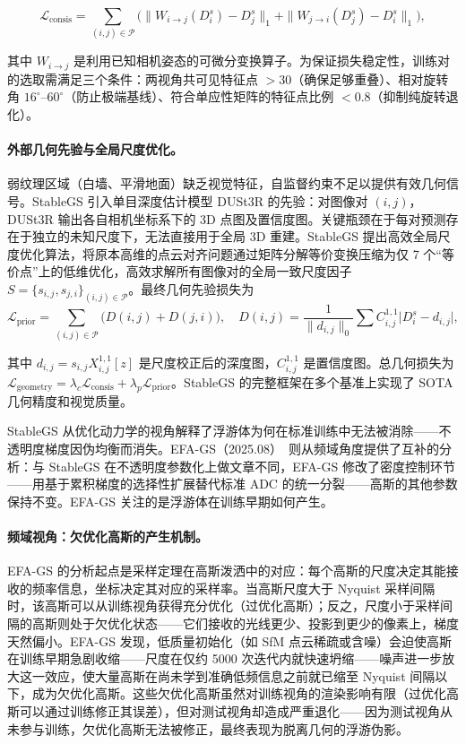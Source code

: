 \begin{equation}
\mathcal{L}_{\mathrm{consis}} = \sum_{(i,j) \in \mathcal{P}} \bigl(\|W_{i \to j}(D_i^s) - D_j^s\|_1 + \|W_{j \to i}(D_j^s) - D_i^s\|_1\bigr),
\label{eq:02_depth_consis}
\end{equation}

其中 $W_{i \to j}$ 是利用已知相机姿态的可微分变换算子。为保证损失稳定性，训练对的选取需满足三个条件：两视角共可见特征点 $>30$（确保足够重叠）、相对旋转角 $16^\circ\text{--}60^\circ$（防止极端基线）、符合单应性矩阵的特征点比例 $< 0.8$（抑制纯旋转退化）。

\paragraph{外部几何先验与全局尺度优化。}弱纹理区域（白墙、平滑地面）缺乏视觉特征，自监督约束不足以提供有效几何信号。StableGS 引入单目深度估计模型 DUSt3R 的先验：对图像对 $(i,j)$，DUSt3R 输出各自相机坐标系下的 3D 点图及置信度图。关键瓶颈在于每对预测存在于独立的未知尺度下，无法直接用于全局 3D 重建。StableGS 提出高效全局尺度优化算法，将原本高维的点云对齐问题通过矩阵分解等价变换压缩为仅 7 个``等价点''上的低维优化，高效求解所有图像对的全局一致尺度因子 $S = \{s_{i,j}, s_{j,i}\}_{(i,j) \in \mathcal{P}}$。最终几何先验损失为
\begin{equation}
\mathcal{L}_{\mathrm{prior}} = \sum_{(i,j) \in \mathcal{P}} \bigl(D(i,j) + D(j,i)\bigr), \quad D(i,j) = \frac{1}{\|d_{i,j}\|_0} \sum C^{1,1}_{i,j} \bigl|D_i^s - d_{i,j}\bigr|,
\label{eq:02_geom_prior}
\end{equation}

其中 $d_{i,j} = s_{i,j} X^{1,1}_{i,j}[z]$ 是尺度校正后的深度图，$C^{1,1}_{i,j}$ 是置信度图。总几何损失为 $\mathcal{L}_{\mathrm{geometry}} = \lambda_c \mathcal{L}_{\mathrm{consis}} + \lambda_p \mathcal{L}_{\mathrm{prior}}$。StableGS 的完整框架在多个基准上实现了 SOTA 几何精度和视觉质量。

StableGS 从优化动力学的视角解释了浮游体为何在标准训练中无法被消除——不透明度梯度因伪均衡而消失。EFA-GS（2025.08）~\cite{2508_02493}则从频域角度提供了互补的分析：与 StableGS 在不透明度参数化上做文章不同，EFA-GS 修改了密度控制环节——用基于累积梯度的选择性扩展替代标准 ADC 的统一分裂——高斯的其他参数保持不变。EFA-GS 关注的是浮游体在训练早期如何产生。

\paragraph{频域视角：欠优化高斯的产生机制。}EFA-GS 的分析起点是采样定理在高斯泼洒中的对应：每个高斯的尺度决定其能接收的频率信息，坐标决定其对应的采样率。当高斯尺度大于 Nyquist 采样间隔时，该高斯可以从训练视角获得充分优化（过优化高斯）；反之，尺度小于采样间隔的高斯则处于欠优化状态——它们接收的光线更少、投影到更少的像素上，梯度天然偏小。EFA-GS 发现，低质量初始化（如 SfM 点云稀疏或含噪）会迫使高斯在训练早期急剧收缩——尺度在仅约 5000 次迭代内就快速坍缩——噪声进一步放大这一效应，使大量高斯在尚未学到准确低频信息之前就已缩至 Nyquist 间隔以下，成为欠优化高斯。这些欠优化高斯虽然对训练视角的渲染影响有限（过优化高斯可以通过训练修正其误差），但对测试视角却造成严重退化——因为测试视角从未参与训练，欠优化高斯无法被修正，最终表现为脱离几何的浮游伪影。

